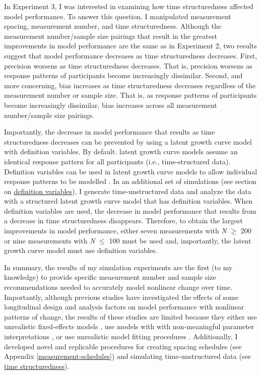 \documentclass[
12pt, %
twoside,
english]{guelphthesis}
\begin{document}
In Experiment 3, I was interested in examining how time structuredness affected model performance. To answer this question, I manipulated measurement spacing, measurement number, and time structuredness. Although the measurement number/sample size pairings that result in the greatest improvements in model performance are the same as in Experiment 2, two results suggest that model performance decreases as time structuredness decreases. First, precision worsens as time structuredness decreases. That is, precision worsens as response patterns of participants become increasingly dissimilar. Second, and more concerning, bias increases as time structuredness decreases regardless of the measurement number or sample size. That is, as response patterns of participants become increasingly dissimilar, bias increases across all measurement number/sample size pairings.

Importantly, the decrease in model performance that results as time structuredness decreases can be prevented by using a latent growth curve model with definition variables. By default. latent growth curve models assume an identical response pattern for all participants (i.e., time-structured data). Definition variables can be used in latent growth curve models to allow individual response patterns to be modelled \autocite{mehta2000,mehta2005}. In an additional set of simulations (see section on \protect\hyperlink{def-variables}{definition variables}), I generate time-unstructured data and analyze the data with a structured latent growth curve model that has definition variables. When definition variables are used, the decrease in model performance that results from a decrease in time structuredness disappears. Therefore, to obtain the largest improvements in model performance, either seven measurements with \emph{N} \(\ge\) 200 or nine measurements with \emph{N} \(\le\) 100 must be used and, importantly, the latent growth curve model must use definition variables.

In summary, the results of my simulation experiments are the first (to my knowledge) to provide specific measurement number and sample size recommendations needed to accurately model nonlinear change over time. Importantly, although previous studies have investigated the effects of some longitudinal design and analysis factors on model performance with nonlinear patterns of change, the results of these studies are limited because they either use unrealistic fixed-effects models \autocite[e.g.,][]{finch2017}, use models with with non-meaningful parameter interpretations \autocites[e.g.,][]{fine2019,liu2022}, or use unrealistic model fitting procedures \autocite{finch2017}. Additionally, I developed novel and replicable procedures for creating spacing schedules (see Appendix \ref{measurement-schedules}) and simulating time-unstructured data (see \protect\hyperlink{simulating-time-struc}{time structuredness}).
\end{document}
